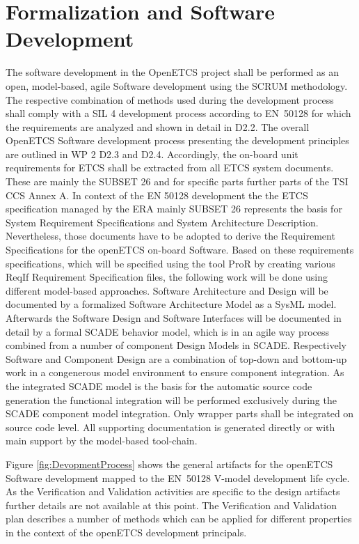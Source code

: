 \documentclass{template/openetcs_report}
\begin{document}
\section{Formalization and Software Development}

The software development in the OpenETCS project shall be performed as an open, model-based, agile Software development using the SCRUM methodology. The respective combination of methods used during the development process shall comply with a SIL 4 development process according to EN~50128 for which the requirements are analyzed and shown in detail in D2.2. The overall OpenETCS Software development process presenting the development principles are outlined in WP 2 D2.3 and D2.4. Accordingly, the on-board unit requirements for ETCS shall be extracted from all ETCS system documents. These are mainly the SUBSET 26  and for specific parts further parts of the TSI CCS Annex A. In context of the EN 50128 development the the ETCS specification managed by the ERA mainly SUBSET 26 represents the basis for System Requirement Specifications and System Architecture Description. Nevertheless, those documents have to be adopted to derive the Requirement Specifications for the openETCS on-board Software. Based on these requirements specifications, which will be specified using the tool ProR by creating various ReqIf Requirement Specification files, the following work will be done using different model-based approaches. Software Architecture and Design will be documented by a formalized Software Architecture Model as a SysML  model. Afterwards the Software Design and Software Interfaces will be documented in detail by a formal SCADE behavior model, which is in an agile way process combined from a number of component Design Models in SCADE. Respectively Software and Component Design are a combination of top-down and bottom-up work in a congenerous model environment to ensure component integration. As the integrated SCADE model is the basis for the automatic source code generation the functional integration will be performed exclusively during the SCADE component model integration. Only wrapper parts shall be integrated on source code level. All supporting documentation is generated directly or with main support by the model-based tool-chain.

Figure \ref{fig:DevopmentProcess} shows the general artifacts for the openETCS Software development mapped to the EN~50128 V-model development life cycle. As the Verification and Validation activities are specific to the design artifacts further details are not available at this point. The Verification and Validation plan describes a number of methods which can be applied for different properties in the context of the openETCS development principals.
\end{document}
